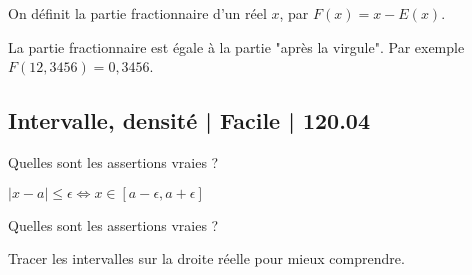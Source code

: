 \begin{question}

On définit la partie fractionnaire d'un réel $x$, par $F(x) = x -E(x)$. 
\begin{answers}



\end{answers}
\begin{explanations}
La partie fractionnaire est égale à la partie "après la virgule".
Par exemple $F(12,3456) = 0,3456$.
\end{explanations}
\end{question}


\subsection{Intervalle, densité | Facile | 120.04}


\begin{question}

Quelles sont les assertions vraies ?
\begin{answers}
    \good{$x \in ]5;7[ \iff |x-6|<1$}

    \bad{$x \in ]5;7[ \iff |x-1|<6$}


\end{answers}
\begin{explanations}
$|x-a| \le \epsilon \iff x \in [a-\epsilon,a+\epsilon]$
\end{explanations}
\end{question}


\begin{question}

Quelles sont les assertions vraies ?
\begin{answers}
    \bad{$[3,7] \cup [8,10] = [3,10]$}

    \bad{$[-3,5] \cap [2,7] = [-3,7]$}

    \bad{$[a,b[\cup ]a,b] = ]a,b[$}

    \good{$[a,b[\cap ]a,b] = ]a,b[$}   
\end{answers}
\begin{explanations}
Tracer les intervalles sur la droite réelle pour mieux comprendre.
\end{explanations}
\end{question}



